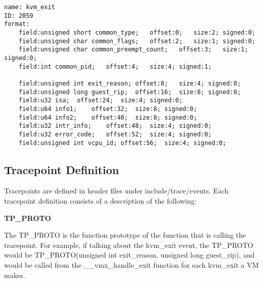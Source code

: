\documentclass{report}
\begin{document}
\begin{spacing}{1.5}
{
\begin{lstlisting}[caption={Format File for the kvm\_exit Linux Kernel Tracepoint Event | Linux kernel V5.18.8},captionpos=b]
name: kvm_exit
ID: 2059
format:
    field:unsigned short common_type;   offset:0;   size:2; signed:0;
    field:unsigned char common_flags;   offset:2;   size:1; signed:0;
    field:unsigned char common_preempt_count;   offset:3;   size:1; signed:0;
    field:int common_pid;   offset:4;   size:4; signed:1;

    field:unsigned int exit_reason; offset:8;   size:4; signed:0;
    field:unsigned long guest_rip;  offset:16;  size:8; signed:0;
    field:u32 isa;  offset:24;  size:4; signed:0;
    field:u64 info1;    offset:32;  size:8; signed:0;
    field:u64 info2;    offset:40;  size:8; signed:0;
    field:u32 intr_info;    offset:48;  size:4; signed:0;
    field:u32 error_code;   offset:52;  size:4; signed:0;
    field:unsigned int vcpu_id; offset:56;  size:4; signed:0;
\end{lstlisting}
}





\subsection{Tracepoint Definition}

{\large
Tracepoints are defined in header files under include/trace/events. Each tracepoint definition consists of a description of the following:
\leavevmode\newline
}

{\large
\textbf{TP\_PROTO}
\leavevmode\newline
}

{\large
The TP\_PROTO is the function prototype of the function that is calling the tracepoint. For example, if talking about the kvm\_exit event, the TP\_PROTO would be TP\_PROTO(unsigned int exit\_reason, unsigned long guest\_rip), and would be called from the \_\_vmx\_handle\_exit function for each kvm\_exit a VM makes.
\newline
}


\end{spacing}
\end{document}
